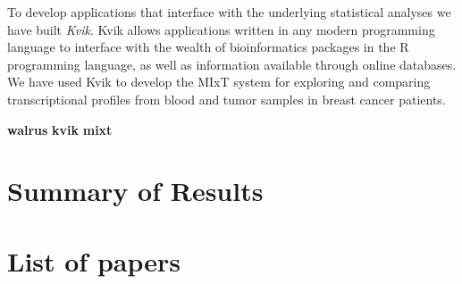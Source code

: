 To develop applications that interface with the underlying statistical analyses
we have built \emph{Kvik}. Kvik allows applications written in any modern
programming language to interface with the wealth of bioinformatics packages in
the R programming language, as well as information available through online
databases. We have used Kvik to develop the MIxT system for exploring and
comparing transcriptional profiles from blood and tumor samples in breast cancer
patients. 


\textbf{walrus}
\textbf{kvik} 
\textbf{mixt} 

\section{Summary of Results} 

\section{List of papers} 
